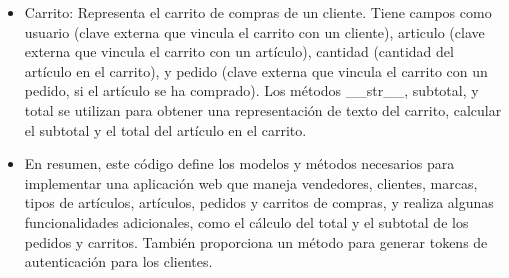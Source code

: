 \documentclass{article}
\begin{document}
\begin{itemize}
        \item Carrito: Representa el carrito de compras de un cliente. Tiene campos como usuario (clave externa que vincula el carrito con un cliente), articulo (clave externa que vincula el carrito con un artículo), cantidad (cantidad del artículo en el carrito), y pedido (clave externa que vincula el carrito con un pedido, si el artículo se ha comprado). Los métodos \_\_str\_\_, subtotal, y total se utilizan para obtener una representación de texto del carrito, calcular el subtotal y el total del artículo en el carrito.
        \item En resumen, este código define los modelos y métodos necesarios para implementar una aplicación web que maneja vendedores, clientes, marcas, tipos de artículos, artículos, pedidos y carritos de compras, y realiza algunas funcionalidades adicionales, como el cálculo del total y el subtotal de los pedidos y carritos. También proporciona un método para generar tokens de autenticación para los clientes.
        
    \end{itemize}
    
    
\end{document}
